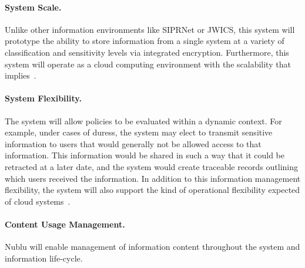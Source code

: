\documentclass[10pt,letterpaper]{article}
\begin{document}
\paragraph{System Scale.} Unlike other information environments like SIPRNet or JWICS, this system will prototype the ability to store information from a single system at a variety of classification and sensitivity levels via integrated encryption.  Furthermore, this system will operate as a cloud computing environment with the scalability that implies~.

\paragraph{System Flexibility.} The system will allow policies to be evaluated within a dynamic context.  For example, under cases of duress, the system may elect to transmit sensitive information to users that would generally not be allowed access to that information.  This information would be shared in such a way that it could be retracted at a later date, and the system would create traceable records outlining which users received the information.  In addition to this information management flexibility, the system will also support the kind of operational flexibility expected of cloud systems~.

\paragraph{Content Usage Management.} Nublu will enable management of information content throughout the system and information life-cycle.
\end{document}
